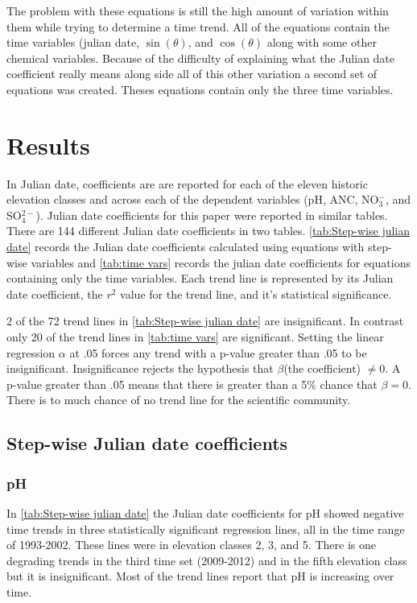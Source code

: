 
 The problem with these equations is still the high amount of variation within them while trying to determine a time trend.  All of the equations contain the time variables (julian date, $\sin(\theta)$, and $\cos(\theta)$ along with some other chemical variables.  Because of the difficulty of explaining what the Julian date coefficient really means along side all of this other variation a second set of equations was created.  Theses equations contain only the three time variables.
 
\section{Results}

In \citet{robinson2008ph} Julian date, coefficients are are reported for each of the eleven historic elevation classes and across each of the dependent variables (pH, ANC, NO$_3^-$, and SO$_4^{2-}$).  Julian date coefficients for this paper were reported in similar tables.  There are 144 different Julian date coefficients in two tables.  \autoref{tab:Step-wise julian date} records the Julian date coefficients calculated using equations with step-wise variables and \autoref{tab:time vars} records the julian date coefficients for  equations containing only the time variables.  Each trend line is represented by its Julian date coefficient, the $r^2$ value for the trend line, and it's statistical significance.

2 of the 72 trend lines in \autoref{tab:Step-wise julian date} are insignificant.  In contrast only 20 of the trend lines in \autoref{tab:time vars} are significant.   Setting the linear regression $\alpha$ at .05 forces any trend with a p-value greater than .05 to be insignificant.  Insignificance rejects the hypothesis that $\beta$(the coefficient) $\neq 0$.  A p-value greater than .05 means that there is greater than a 5$\%$ chance that $\beta=0$.  There is to much chance of no trend line for the scientific community.

\subsection{Step-wise Julian date coefficients}

\subsubsection{pH}

In \autoref{tab:Step-wise julian date} the Julian date coefficients for pH showed negative time trends in three statistically significant regression lines, all in the time range of 1993-2002.  These lines were in elevation classes 2, 3, and 5.  There is one degrading trends in the third time set (2009-2012) and in the fifth elevation class but it is insignificant.   Most of the trend lines report that pH is increasing over time.

